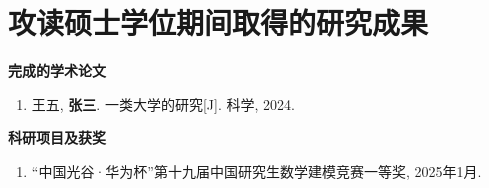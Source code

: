 \pagestyle{fancy}
\fancyhead{} %

\fancyhead[CO]{\leftmark} %
\chapter{攻读硕士学位期间取得的研究成果}

{\noindent\textbf{完成的学术论文}}
\begin{enumerate}\setlength{\itemsep}{0pt}
\renewcommand{\labelenumi}{[\theenumi]}
\item 王五, \textbf{张三}. 一类大学的研究[J]. 科学, 2024.
\end{enumerate}

{\noindent\textbf{科研项目及获奖}}
\begin{enumerate}\setlength{\itemsep}{0pt}
\renewcommand{\labelenumi}{[\theenumi]}
\item “中国光谷·华为杯”第十九届中国研究生数学建模竞赛一等奖, 2025年1月.
\end{enumerate}
